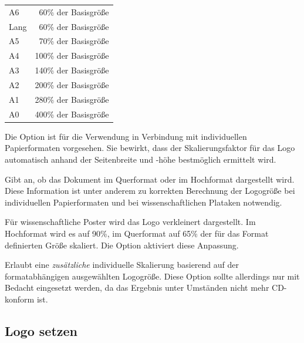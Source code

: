 \begin{tabular}{lr}
  A6  & 60\% der Basisgröße   \\
  Lang& 60\% der Basisgröße   \\
  A5  & 70\% der Basisgröße   \\
  A4  & 100\% der Basisgröße  \\
  A3  & 140\% der Basisgröße  \\
  A2  & 200\% der Basisgröße  \\
  A1  & 280\% der Basisgröße  \\
  A0  & 400\% der Basisgröße   \\
\end{tabular}

\begin{Declaration}
\end{Declaration}
Die Option  ist für die Verwendung in Verbindung mit
individuellen Papierformaten vorgesehen.
Sie bewirkt, dass der Skalierungsfaktor für das Logo automatisch anhand
der Seitenbreite und -höhe bestmöglich ermittelt wird.

\begin{Declaration}
\end{Declaration}
Gibt an, ob das Dokument im Querformat oder im Hochformat dargestellt wird.
Diese Information ist unter anderem zu korrekten Berechnung der Logogröße
bei individuellen Papierformaten und bei wissenschaftlichen Plataken notwendig.

\begin{Declaration}
\end{Declaration}
Für wissenschaftliche Poster wird das Logo verkleinert dargestellt.
Im Hochformat wird es auf 90\%, im Querformat auf 65\% der für das Format
definierten Größe skaliert.
Die Option  aktiviert diese Anpassung.


\begin{Declaration}
\end{Declaration}

Erlaubt eine \emph{zusätzliche} individuelle Skalierung basierend auf
der formatabhängigen ausgewählten Logogröße. Diese Option sollte allerdings
nur mit Bedacht eingesetzt werden, da das Ergebnis unter Umständen nicht mehr
CD-konform ist.

\subsection{Logo setzen}

